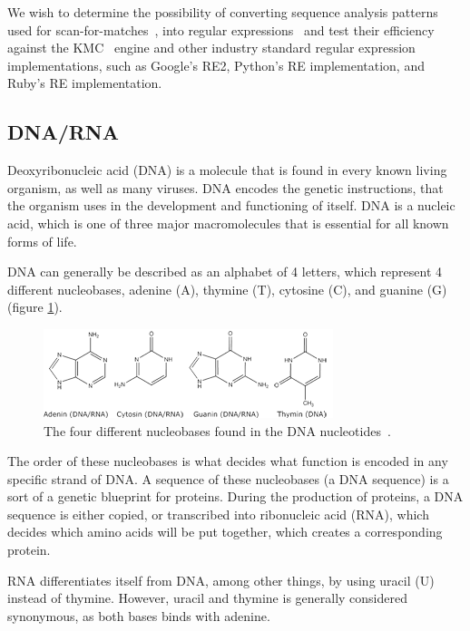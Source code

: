 \documentclass[12pt]{article}
\theoremstyle{definition}
\begin{document}
We wish to determine the possibility of converting sequence analysis patterns used for scan-for-matches~\cite{scan-for-matches}, into regular expressions~\cite{crash-course-regex} and test their efficiency against the KMC~\cite{kmc-website} engine and other industry standard regular expression implementations, such as Google's RE2, Python's RE implementation, and Ruby's RE implementation.

\subsection{DNA/RNA}

Deoxyribonucleic acid (DNA) is a molecule that is found in every known living organism, as well as many viruses. DNA encodes the genetic instructions, that the organism uses in the development and functioning of itself. DNA is a nucleic acid, which is one of three major macromolecules that is essential for all known forms of life.

DNA can generally be described as an alphabet of 4 letters, which represent 4 different nucleobases, adenine (A), thymine (T), cytosine (C), and guanine (G) (figure \ref{dnabases}).

\begin{figure}[H]
\label{dnabases}
\begin{center}
	\includegraphics[scale=4]{dnabaserne.png}
\end{center}
\caption{The four different nucleobases found in the DNA nucleotides~\cite{DNA-biotechacademy}.}
\end{figure}

The order of these nucleobases is what decides what function is encoded in any specific strand of DNA. A sequence of these nucleobases (a DNA sequence) is a sort of a genetic blueprint for proteins. During the production of proteins, a DNA sequence is either copied, or transcribed into ribonucleic acid (RNA), which decides which amino acids will be put together, which creates a corresponding protein.

RNA differentiates itself from DNA, among other things, by using uracil (U) instead of thymine. However, uracil and thymine is generally considered synonymous, as both bases binds with adenine.
\end{document}

